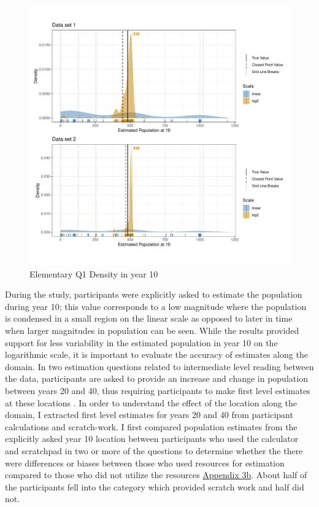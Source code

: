 \documentclass[print]{nuthesis}
\begin{document}
\begin{figure}[tbp]

{\centering \includegraphics[width=1\linewidth,]{thesis_files/figure-latex/qe1-density-plot-10-all-1} 

}

\caption{Elementary Q1 Density in year 10}\label{fig:qe1-density-plot-10-all}
\end{figure}

During the study, participants were explicitly asked to estimate the population during year 10; this value corresponds to a low magnitude where the population is condensed in a small region on the linear scale as opposed to later in time when larger magnitudes in population can be seen.
While the results provided support for less variability in the estimated population in year 10 on the logarithmic scale, it is important to evaluate the accuracy of estimates along the domain.
In two estimation questions related to intermediate level reading between the data, participants are asked to provide an increase and change in population between years 20 and 40, thus requiring participants to make first level estimates at these locations .
In order to understand the effect of the location along the domain, I extracted first level estimates for years 20 and 40 from participant calculations and scratch-work.
I first compared population estimates from the explicitly asked year 10 location between participants who used the calculator and scratchpad in two or more of the questions to determine whether the there were differences or biases between those who used resources for estimation compared to those who did not utilize the resources \protect\hyperlink{estimation-comparison}{Appendix 3b}.
About half of the participants fell into the category which provided scratch work and half did not.
\end{document}
